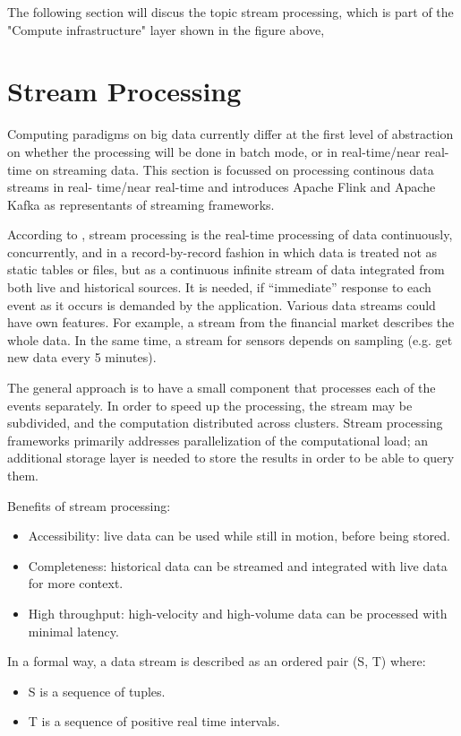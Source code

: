 The following section will discus the topic stream processing, which is part of the
"Compute infrastructure" layer shown in the figure above,

\section{Stream Processing}

Computing paradigms on big data currently differ at the first level of abstraction on
whether the processing will be done in batch mode, or in real-time/near real-time on
streaming data. This section is focussed on processing continous data streams in real-
time/near real-time and introduces Apache Flink and Apache Kafka as representants of
streaming frameworks.

According to \cite{Klepp16}, stream processing is the real-time processing of data continuously,
concurrently, and in a record-by-record fashion in which data is treated not as static tables
or files, but as a continuous infinite stream of data integrated from both live and historical
sources. It is needed, if “immediate” response to each event as it occurs is demanded by
the application. Various data streams could have own features. For example, a stream
from the financial market describes the whole data. In the same time, a stream for sensors
depends on sampling (e.g. get new data every 5 minutes).

The general approach is to have a small component that processes each of the events
separately. In order to speed up the processing, the stream may be subdivided, and the
computation distributed across clusters. Stream processing frameworks primarily addresses
parallelization of the computational load; an additional storage layer is needed to store
the results in order to be able to query them.

Benefits of stream processing:

\begin{itemize}
	\item Accessibility: live data can be used while still in motion, before being stored.
	\item Completeness: historical data can be streamed and integrated with live data for
	more context.
	\item High throughput: high-velocity and high-volume data can be processed with minimal latency.
\end{itemize}

In a formal way, a data stream is described as an ordered pair (S, T) where:
\begin{itemize}
	\item S is a sequence of tuples.
	\item T is a sequence of positive real time intervals.
\end{itemize}

